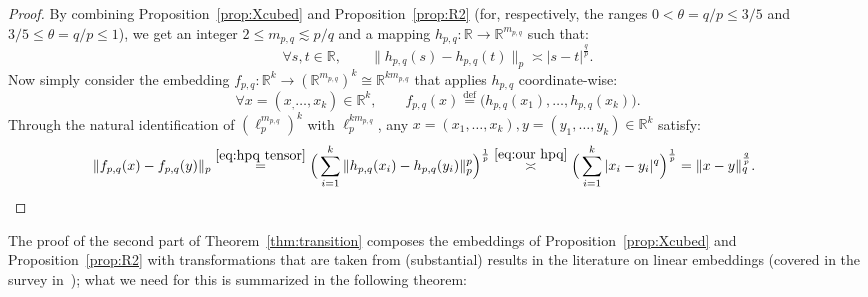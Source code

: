 \documentclass[11pt,reqno]{amsart}
\newcommand{\R}{\mathbb{R}}
\renewcommand{\le}{\leqslant}
\newcommand{\eqdef}{\stackrel{\mathrm{def}}{=}}
\newcommand{\1}{\mathbf{1}}
\begin{document}
\begin{proof} By combining Proposition~\ref{prop:Xcubed} and Proposition~\ref{prop:R2} (for, respectively, the ranges $0<\theta=q/p\le 3/5$ and $3/5\le \theta=q/p\le 1$), we get an integer  $2\le m_{p,q}\lesssim p/q$ and a mapping $h_{p,q}:\R\to \R^{m_{p,q}}$ such that: 
\begin{equation}\label{eq:our hpq}
\forall s,t\in \R,\qquad \|h_{p,q}(s)-h_{p,q}(t)\|_p\asymp |s-t|^{\frac{q}{p}}. 
\end{equation}
Now simply consider the embedding  $f_{p,q}:\R^k\to (\R^{m_{p,q}})^k\cong \R^{km_{p,q}}$ that applies $h_{p,q}$ coordinate-wise:
\begin{equation}\label{eq:hpq tensor}
\forall x=(x_,\ldots,x_k)\in \R^k,\qquad f_{p,q}(x)\eqdef \big(h_{p,q}(x_1),\ldots,h_{p,q}(x_k)\big).
\end{equation}
Through the natural identification of $(\ell_p^{m_{p,q}})^{k}$ with $\ell_p^{km_{p,q}}$, any $x=(x_1,\ldots,x_k),y=(y_1,\ldots,y_k)\in \R^k$ satisfy: 
\begin{equation*}
\|f_{p,q}(x)-f_{p,q}(y)\|_{p}\stackrel{\eqref{eq:hpq tensor}}{=} \Big(\sum_{i=1}^k \|h_{p,q}(x_i)-h_{p,q}(y_i)\|_{p}^p\Big)^{\frac{1}{p}}\stackrel{\eqref{eq:our hpq}}{\asymp}\Big(\sum_{i=1}^k |x_i-y_i|^q\Big)^{\frac{1}{p}}=\|x-y\|_q^{\frac{q}{p}}. \tag*{\qedhere}
\end{equation*}
\end{proof}
 





The proof of the second part of Theorem~\ref{thm:transition}  composes the embeddings of Proposition~\ref{prop:Xcubed} and Proposition~\ref{prop:R2} with transformations that are  taken from (substantial) results in the literature on linear embeddings (covered in the survey in~\cite{JS01}); what we need for this is summarized in the following theorem: 
\end{document}
